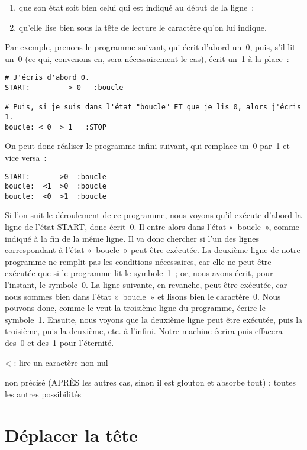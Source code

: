 \documentclass[a4paper, 11pt]{report}
\begin{document}
\begin{enumerate}
\item que son état soit bien celui qui est indiqué au début de la
  ligne~;
\item qu'elle lise bien sous la tête de lecture le caractère qu'on lui
  indique.
\end{enumerate}


Par exemple, prenons le programme suivant, qui écrit d'abord un~0, puis,
s'il lit un~0 (ce qui, convenons-en, sera nécessairement le cas), écrit
un~1 à la place~:



\begin{verbatim}
# J'écris d'abord 0.
START:         > 0   :boucle

# Puis, si je suis dans l'état "boucle" ET que je lis 0, alors j'écris 1.
boucle: < 0  > 1   :STOP 
\end{verbatim}


On peut donc réaliser le programme infini suivant, qui remplace un~0
par~1 et vice versa~:



\begin{verbatim}
START:       >0  :boucle
boucle:  <1  >0  :boucle
boucle:  <0  >1  :boucle
\end{verbatim}


Si l'on suit le déroulement de ce programme, nous voyons qu'il exécute
d'abord la ligne de l'état START, donc écrit~0. Il entre alors dans
l'état «~boucle~», comme indiqué à la fin de la même ligne. Il va donc
chercher si l'un des lignes correspondant à l'état «~boucle~» peut être
exécutée. La deuxième ligne de notre programme ne remplit pas les
conditions nécessaires, car elle ne peut être exécutée que si le
programme lit le symbole~1~; or, nous avons écrit, pour l'instant, le
symbole~0. La ligne suivante, en revanche, peut être exécutée, car nous
sommes bien dans l'état «~boucle~» et lisons bien le caractère~0. Nous
pouvons donc, comme le veut la troisième ligne du programme, écrire le
symbole~1. Ensuite, nous voyons que la deuxième ligne peut être
exécutée, puis la troisième, puis la deuxième, etc. à l'infini. Notre
machine écrira puis effacera des~0 et des~1 pour l'éternité.


< : lire un caractère non nul

non précisé (APRÈS les autres cas, sinon il est glouton et absorbe tout)
: toutes les autres possibilités




\section{Déplacer la tête}
\end{document}
